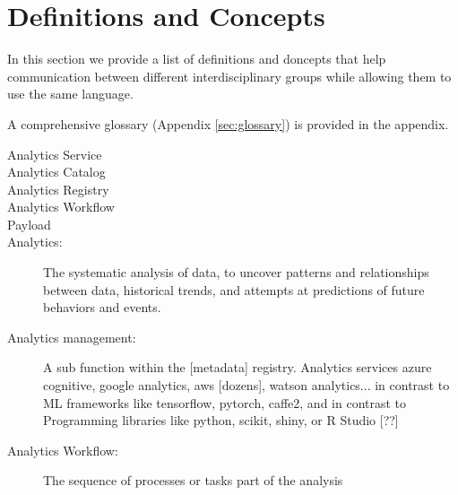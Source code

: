 
\section{Definitions and Concepts}
\label{sec:definitions}

In this section we provide a list of definitions and doncepts that
help communication between different interdisciplinary groups while
allowing them to use the same language.

A comprehensive glossary (Appendix \ref{sec:glossary}) is provided in the appendix. 

\begin{description}

\item[Analytics Service] 

\item[Analytics Catalog]

\item[Analytics Registry]

\item[Analytics Workflow]

\item[Payload]

\item[Analytics:] The systematic analysis of data, to uncover patterns and relationships between data,
historical trends, and attempts at predictions of future behaviors and events.

\item[Analytics management:] A sub function within the [metadata] registry.
Analytics services azure cognitive, google analytics, aws [dozens], watson analytics... in contrast
to ML frameworks like tensorflow, pytorch, caffe2, and in contrast to Programming libraries
like python, scikit, shiny, or R Studio [??]

\item[Analytics Workflow:] The sequence of processes or tasks part of the analysis


\end{description}

